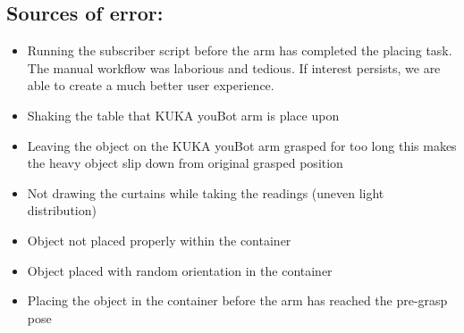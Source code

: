     \subsection{Sources of error:}
    \begin{itemize}
        \item Running the subscriber script before the arm has completed the placing task. The manual workflow was laborious and tedious. If interest persists, we are able to create a much better user experience. 
        \item Shaking the table that KUKA youBot arm is place upon %
        \item Leaving the object on the KUKA youBot arm grasped for too long this makes the heavy object slip down from original grasped position
        \item Not drawing the curtains while taking the readings (uneven light distribution)
        \item Object not placed properly within the container
        \item Object placed with random orientation in the container
        \item Placing the object in the container before the arm has reached the pre-grasp pose
        
    \end{itemize}
    
    
